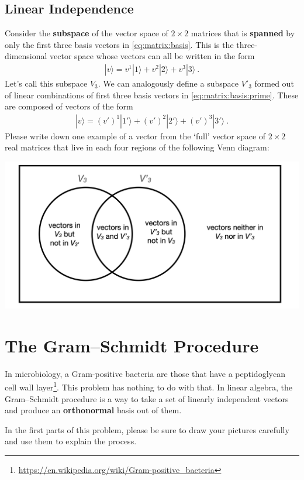 \documentclass[12pt]{article}
\numberwithin{equation}{section}    %
\begin{document}
\subsection{Linear Independence}

Consider the \textbf{subspace} of the vector space of $2\times 2$ matrices that is \textbf{spanned} by only the first three basis vectors in \eqref{eq:matrix:basis}. This is the three-dimensional vector space whose vectors can all be written in the form
\begin{align}
	|v\rangle = v^1|1\rangle + v^2 |2\rangle + v^3 |3\rangle \ .
\end{align}
Let's call this subspace $V_3$. We can analogously define a subspace $V'_3$ formed out of linear combinations of first three basis vectors in \eqref{eq:matrix:basis:prime}. These are composed of vectors of the form
\begin{align}
	|v\rangle = (v')^1|1'\rangle + (v')^2 |2'\rangle + (v')^3 |3'\rangle \ .
\end{align}
Please write down one example of a vector from the `full' vector space of $2\times 2$ real matrices that live in each four regions of the following Venn diagram:

\begin{center}
\includegraphics[width=.5\textwidth]{figures/HW1b_vectors.png}
\end{center}

\section{The Gram--Schmidt Procedure}

In microbiology, a Gram-positive bacteria are those that have a peptidoglycan cell wall layer\footnote{\url{https://en.wikipedia.org/wiki/Gram-positive_bacteria}}. This problem has nothing to do with that. In linear algebra, the Gram--Schmidt procedure is a way to take a set of linearly independent vectors and produce an \textbf{orthonormal} basis out of them.

In the first parts of this problem, please be sure to draw your pictures carefully and use them to explain the process.
\end{document}
